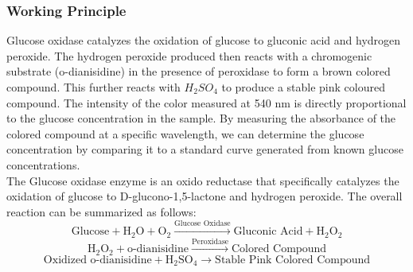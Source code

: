 \documentclass[openany]{book}
\begin{document}
\subsubsection{Working Principle}
Glucose oxidase catalyzes the oxidation of glucose to gluconic acid and hydrogen peroxide. The hydrogen peroxide produced then reacts with a chromogenic substrate (o-dianisidine) in the presence of peroxidase to form a brown colored compound. This further reacts with $H_2SO_4$ to produce a stable pink coloured compound. The intensity of the color measured at 540 nm is directly proportional to the glucose concentration in the sample. By measuring the absorbance of the colored compound at a specific wavelength, we can determine the glucose concentration by comparing it to a standard curve generated from known glucose concentrations. \\
The Glucose oxidase enzyme is an oxido reductase that specifically catalyzes the oxidation of glucose to D-glucono-1,5-lactone and hydrogen peroxide. The overall reaction can be summarized as follows:
$$\text{Glucose} + \text{H}_2\text{O} + \text{O}_2 \xrightarrow{\text{Glucose Oxidase}} \text{Gluconic Acid} + \text{H}_2\text{O}_2$$
$$\text{H}_2\text{O}_2 + \text{o-dianisidine} \xrightarrow{\text{Peroxidase}} \text{Colored Compound}$$
$$\text{Oxidized o-dianisidine} + \text{H}_2\text{SO}_4 \rightarrow \text{Stable Pink Colored Compound}$$
\end{document}

